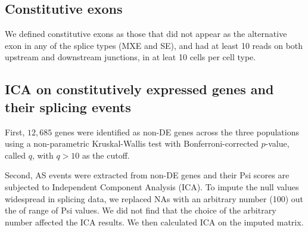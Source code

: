 
\subsection{Constitutive exons}

We defined constitutive exons as those that did not appear as the alternative exon in any of the splice types (MXE and SE), and had at least 10 reads on both upstream and downstream junctions, in at leat 10 cells per cell type.

\subsection{ICA on constitutively expressed genes and their splicing events}
First, $12,685$ genes were identified as non-DE genes across the three populations using a non-parametric Kruskal-Wallis test with Bonferroni-corrected $p$-value, called $q$, with $q > 10$ as the cutoff.

Second, AS events were extracted from non-DE genes and their Psi scores are subjected to Independent Component Analysis (ICA). To impute the null values widespread in splicing data, we replaced NAs with an arbitrary number (100) out the of range of Psi values. We did not find that the choice of the arbitrary number affected the ICA results. We then calculated ICA on the imputed matrix.

